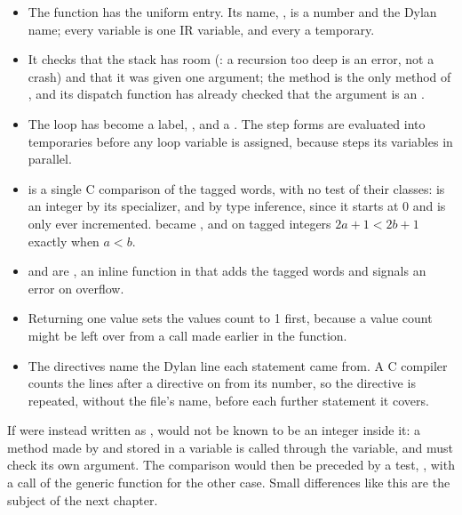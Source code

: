 \begin{itemize}
\item The function has the uniform entry. Its name, ,
  is a number and the Dylan name; every variable  is
  one IR variable, and every  a temporary.
\item It checks that the stack has room (: a
  recursion too deep is an error, not a crash) and that it was given one
  argument; the method is the only
  method of , and its dispatch function has already checked
  that the argument is an .
\item The  loop has become a label, , and a
  . The step forms are evaluated into temporaries before any
  loop variable is assigned, because  steps its variables in
  parallel.
\item {} is a single C comparison of the tagged words, with
  no test of their classes:  is an integer by its specializer,
  and  by type inference, since it starts at 0 and is only ever
  incremented.  became , and on tagged
  integers $2a+1 < 2b+1$ exactly when $a<b$.
\item {} and  are ,
  an inline function in  that adds the tagged words and
  signals an error on overflow.
\item Returning one value sets the values count to 1 first, because a
  value count might be left over from a call made earlier in the
  function.
\item The  directives name the Dylan line each statement came
  from. A C compiler counts the lines after a directive on from its
  number, so the directive is repeated, without the file's name, before
  each further statement it covers.
\end{itemize}

If  were instead written as ,  would not be known to be an integer
inside it: a method made by  and stored in a variable is
called through the variable, and must check its own argument. The
comparison would then be preceded by a test, , with a call of the generic function
 for the other case. Small differences like this are the
subject of the next chapter.

\fussy
